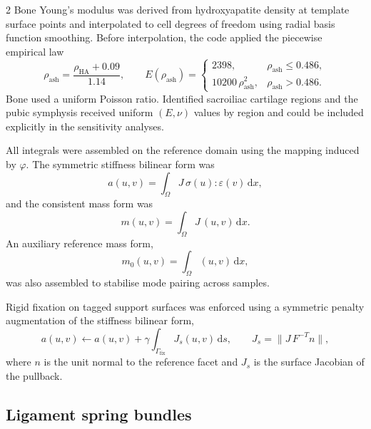 \documentclass[openacc]{rsproca_new}
\begin{document}
\begin{multicols}{2}
Bone Young's modulus was derived from hydroxyapatite density at template surface points and interpolated to cell degrees of freedom using radial basis function smoothing. Before interpolation, the code applied the piecewise empirical law
\begin{equation}
\rho_{\mathrm{ash}}=\frac{\rho_{\mathrm{HA}}+0.09}{1.14}, \qquad
E(\rho_{\mathrm{ash}})=
\begin{cases}
2398, & \rho_{\mathrm{ash}}\leq 0.486,\\
10200\,\rho_{\mathrm{ash}}^{2}, & \rho_{\mathrm{ash}}>0.486.
\end{cases}
\end{equation}
Bone used a uniform Poisson ratio. Identified sacroiliac cartilage regions and the pubic symphysis received uniform $(E,\nu)$ values by region and could be included explicitly in the sensitivity analyses.

All integrals were assembled on the reference domain using the mapping induced by $\varphi$. The symmetric stiffness bilinear form was
\begin{equation}
a(u,v)=\int_{\Omega} J\,\sigma(u):\varepsilon(v)\,\mathrm{d}x,
\end{equation}
and the consistent mass form was
\begin{equation}
m(u,v)=\int_{\Omega} J\,(u,v)\,\mathrm{d}x.
\end{equation}
An auxiliary reference mass form,
\begin{equation}
m_{0}(u,v)=\int_{\Omega}(u,v)\,\mathrm{d}x,
\end{equation}
was also assembled to stabilise mode pairing across samples.

Rigid fixation on tagged support surfaces was enforced using a symmetric penalty augmentation of the stiffness bilinear form,
\begin{equation}
a(u,v)\leftarrow a(u,v)+\gamma\int_{\Gamma_{\mathrm{fix}}}J_{s}(u,v)\,\mathrm{d}s,
\qquad
J_{s}=\|J\,F^{-T}n\|,
\end{equation}
where $n$ is the unit normal to the reference facet and $J_{s}$ is the surface Jacobian of the pullback.

\subsection{Ligament spring bundles}


\end{multicols}
\end{document}
